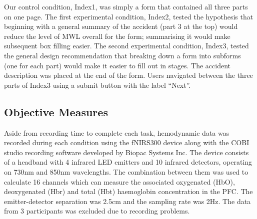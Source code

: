 \documentclass[../main/Feedback.tex]{subfiles}
\begin{document}
Our control condition, Index1, was simply a form that contained all three parts on one page. 
The first experimental condition, Index2, tested the hypothesis that beginning with a general summary of the accident (part 3 at the top) would reduce the level of MWL overall for the form; summarising it would make subsequent box filling easier.
The second experimental condition, Index3, tested the general design recommendation that breaking down a form into subforms (one for each part) would make it easier to fill out in stages. 
The accident description was placed at the end of the form. %
Users navigated between the three parts of Index3 using a submit button with the label ``Next''.



\subsection{Objective Measures}
Aside from recording time to complete each task, hemodynamic data was recorded during each condition using the fNIRS300 device along with the COBI studio recording software developed by Biopac Systems Inc.
The device consists of a headband with 4 infrared LED emitters and 10 infrared detectors, operating on 730nm and 850nm wavelengths.
The combination between them was used to calculate 16 channels which can measure the associated oxygenated (HbO), deoxygenated (Hbr) and total (Hbt) haemoglobin concentration in the PFC.
The emitter-detector separation was 2.5cm and the sampling rate was 2Hz.
The data from 3 participants was excluded due to recording problems.
\end{document}
